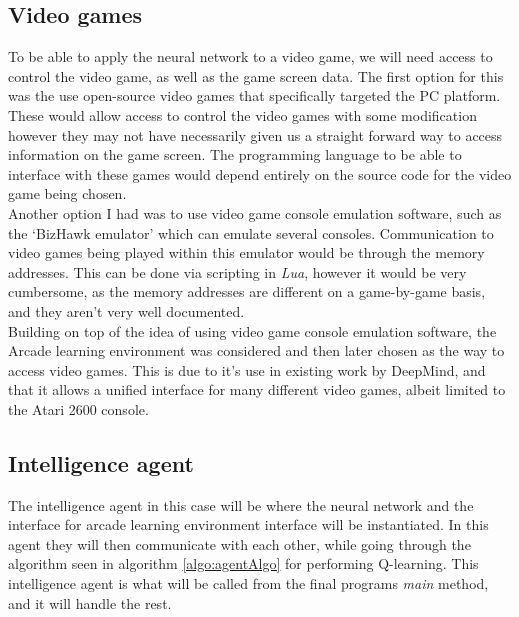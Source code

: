 \documentclass[10pt]{article}
\begin{document}
	\subsection{Video games}
		To be able to apply the neural network to a video game, we will need access to control the video game, as well as the game screen data. The first option for this was the use open-source video games that specifically targeted the PC platform. These would allow access to control the video games with some modification however they may not have necessarily given us a straight forward way to access information on the game screen. The programming language to be able to interface with these games would depend entirely on the source code for the video game being chosen.\\
		
		Another option I had was to use video game console emulation software, such as the `BizHawk emulator'\cite{biz} which can emulate several consoles. Communication to video games being played within this emulator would be through the memory addresses. This can be done via scripting in \textit{Lua}, however it would be very cumbersome, as the memory addresses are different on a game-by-game basis, and they aren't very well documented.\\
		
		Building on top of the idea of using video game console emulation software, the Arcade learning environment was considered and then later chosen as the way to access video games. This is due to it's use in existing work by DeepMind, and that it allows a unified interface for many different video games, albeit limited to the Atari 2600 console.\\	
	
	\medskip	
	
	\subsection{Intelligence agent}
	
		The intelligence agent in this case will be where the neural network and the interface for arcade learning environment interface will be instantiated. In this agent they will then communicate with each other, while going through the algorithm seen in algorithm \ref{algo:agentAlgo} for performing Q-learning. This intelligence agent is what will be called from the final programs \textit{main} method, and it will handle the rest.\\
		
\end{document}
